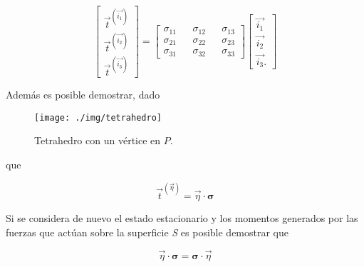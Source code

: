 \documentclass{article}
\begin{document}
    \begin{equation}
        \begin{bmatrix}
            \vec{t}^{(\vec{i_{1}})} \\
            \vec{t}^{(\vec{i_{2}})} \\
            \vec{t}^{(\vec{i_{3}})}
        \end{bmatrix}
        =
        \begin{bmatrix}
            \sigma_{11} && \sigma_{12} && \sigma_{13} \\
            \sigma_{21} && \sigma_{22} && \sigma_{23} \\
            \sigma_{31} && \sigma_{32} && \sigma_{33}
        \end{bmatrix}
        \begin{bmatrix}
            \vec{i_{1}} \\
            \vec{i_{2}} \\
            \vec{i_{3}}.
        \end{bmatrix}
    \end{equation}
    
    \newpage

    Adem\'{a}s es posible demostrar, dado

    \begin{figure}[H]
        
        \centering
        \texttt{[image: ./img/tetrahedro]}
        \caption{Tetrahedro con un v\'{e}rtice en $P$.}
        \label{fig:tetrahedro}

    \end{figure}

    que

    \begin{equation}
        \vec{t}^{(\vec{\eta})} = \vec{\eta}\cdot\bm{\sigma}
    \end{equation}


    Si se considera de nuevo el estado estacionario y los momentos generados por las fuerzas
    que act\'{u}an sobre la superficie \textit{S} es posible demostrar que

    \begin{equation}
        \vec{\eta}\cdot\bm{\sigma} = \bm{\sigma}\cdot\vec{\eta}
    \end{equation}
\end{document}
